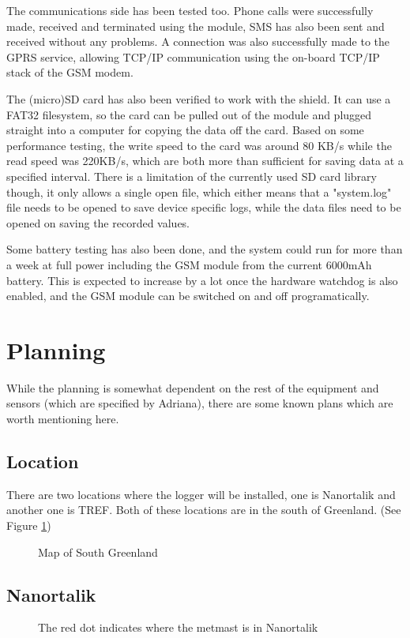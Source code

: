 \documentclass{project}
\begin{document}
The communications side has been tested too. Phone calls were successfully made, received and terminated using the module, SMS has also been sent and received without any problems. A connection was also successfully made to the GPRS service, allowing TCP/IP communication using the on-board TCP/IP stack of the GSM modem.

The (micro)SD card has also been verified to work with the shield. It can use a FAT32 filesystem, so the card can be pulled out of the module and plugged straight into a computer for copying the data off the card. Based on some performance testing, the write speed to the card was around 80 KB/s while the read speed was 220KB/s, which are both more than sufficient for saving data at a specified interval.
There is a limitation of the currently used SD card library though, it only allows a single open file, which either means that a "system.log" file needs to be opened to save device specific logs, while the data files need to be opened on saving the recorded values.

Some battery testing has also been done, and the system could run for more than a week at full power including the GSM module from the current 6000mAh battery. This is expected to increase by a lot once the hardware watchdog is also enabled, and the GSM module can be switched on and off programatically.

\section{Planning}
While the planning is somewhat dependent on the rest of the equipment and sensors (which are specified by Adriana), there are some known plans which are worth mentioning here.

\subsection{Location}
There are two locations where the logger will be installed, one is Nanortalik and another one is TREF. Both of these locations are in the south of Greenland. (See Figure \ref{southgl})
\begin{figure}[!ht]
\centering
{}
\caption{Map of South Greenland}
\label{southgl}
\end{figure}

\subsection{Nanortalik}
\begin{figure}[!ht]
\centering
{}
\caption{The red dot indicates where the metmast is in Nanortalik}
\label{nanortalik}
\end{figure}
\end{document}

